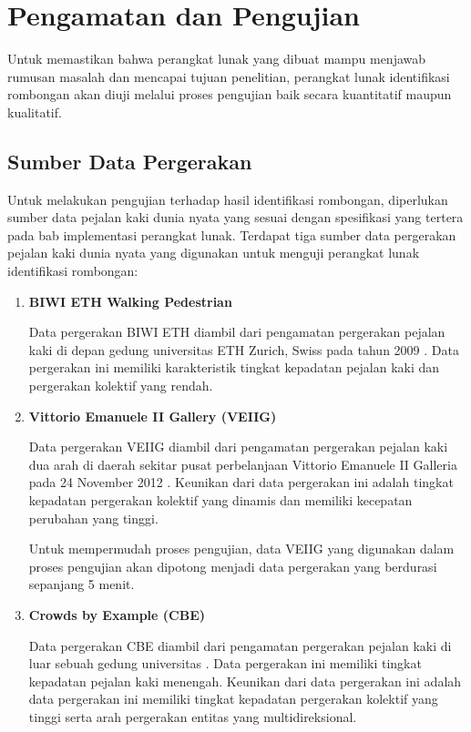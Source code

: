 \chapter{Pengamatan dan Pengujian}
\label{chap:pengujian}

Untuk memastikan bahwa perangkat lunak yang dibuat mampu menjawab rumusan masalah dan mencapai tujuan penelitian, perangkat lunak identifikasi rombongan akan diuji melalui proses pengujian baik secara kuantitatif maupun kualitatif.

\section{Sumber Data Pergerakan}
\label{bab6:data-pergerakan}

Untuk melakukan pengujian terhadap hasil identifikasi rombongan, diperlukan sumber data pejalan kaki dunia nyata yang sesuai dengan spesifikasi yang tertera pada bab implementasi perangkat lunak. Terdapat tiga sumber data pergerakan pejalan kaki dunia nyata yang digunakan untuk menguji perangkat lunak identifikasi rombongan:

\begin{enumerate}
    \item \textbf{BIWI ETH Walking Pedestrian}
    
    Data pergerakan BIWI ETH diambil dari pengamatan pergerakan pejalan kaki di depan gedung universitas ETH Zurich, Swiss pada tahun 2009 \cite{pellegrini:eth}. Data pergerakan ini memiliki karakteristik tingkat kepadatan pejalan kaki dan pergerakan kolektif yang rendah.
    
    \item \textbf{Vittorio Emanuele II Gallery (VEIIG)}
    
    Data pergerakan VEIIG diambil dari pengamatan pergerakan pejalan kaki dua arah di daerah sekitar pusat perbelanjaan Vittorio Emanuele II Galleria pada 24 November 2012 \cite{bandini:gveii}. Keunikan dari data pergerakan ini adalah tingkat kepadatan pergerakan kolektif yang dinamis dan memiliki kecepatan perubahan yang tinggi. 
    
    Untuk mempermudah proses pengujian, data VEIIG yang digunakan dalam proses pengujian akan dipotong menjadi data pergerakan yang berdurasi sepanjang 5 menit.
    
    \item \textbf{Crowds by Example (CBE)}
    
    Data pergerakan CBE diambil dari pengamatan pergerakan pejalan kaki di luar sebuah gedung universitas \cite{solera:06:range-reference}. Data pergerakan ini memiliki tingkat kepadatan pejalan kaki menengah. Keunikan dari data pergerakan ini adalah data pergerakan ini memiliki tingkat kepadatan pergerakan kolektif yang tinggi serta arah pergerakan entitas yang multidireksional.
\end{enumerate}

